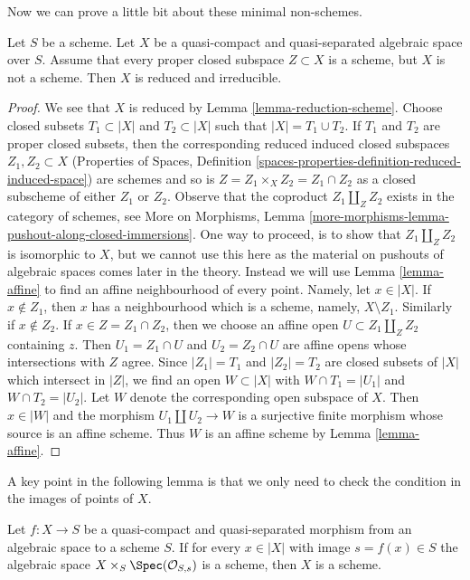 \noindent
Now we can prove a little bit about these minimal non-schemes.

\begin{lemma}
\label{lemma-minimal-nonscheme}
Let $S$ be a scheme. Let $X$ be a quasi-compact and quasi-separated
algebraic space over $S$. Assume that every proper closed subspace
$Z \subset X$ is a scheme, but $X$ is not a scheme. Then $X$ is reduced
and irreducible.
\end{lemma}

\begin{proof}
We see that $X$ is reduced by Lemma \ref{lemma-reduction-scheme}.
Choose closed subsets $T_1 \subset |X|$ and $T_2 \subset |X|$ such that
$|X| = T_1 \cup T_2$. If $T_1$ and $T_2$ are proper closed subsets,
then the corresponding reduced induced closed subspaces $Z_1, Z_2 \subset X$
(Properties of Spaces, Definition
\ref{spaces-properties-definition-reduced-induced-space})
are schemes and so is $Z = Z_1 \times_X Z_2 = Z_1 \cap Z_2$ as a closed
subscheme of either $Z_1$ or $Z_2$. Observe that the coproduct
$Z_1 \amalg_Z Z_2$ exists in the category of schemes, see
More on Morphisms, Lemma
\ref{more-morphisms-lemma-pushout-along-closed-immersions}.
One way to proceed, is to show that $Z_1 \amalg_Z Z_2$ is isomorphic to $X$,
but we cannot use this here as the material on pushouts of algebraic
spaces comes later in the theory. Instead we will use
Lemma \ref{lemma-affine} to find an affine neighbourhood of every point.
Namely, let $x \in |X|$. If $x \not \in Z_1$, then $x$ has a neighbourhood
which is a scheme, namely, $X \setminus Z_1$. Similarly if $x \not \in Z_2$.
If $x \in Z = Z_1 \cap Z_2$, then we choose an affine open
$U \subset Z_1 \amalg_Z Z_2$ containing $z$. Then $U_1 = Z_1 \cap U$
and $U_2 = Z_2 \cap U$ are affine opens whose intersections with
$Z$ agree. Since $|Z_1| = T_1$ and $|Z_2| = T_2$ are closed subsets of
$|X|$ which intersect in $|Z|$, we find an open $W \subset |X|$
with $W \cap T_1 = |U_1|$ and $W \cap T_2 = |U_2|$. Let $W$ denote the
corresponding open subspace of $X$. Then $x \in |W|$ and the morphism
$U_1 \amalg U_2 \to W$ is a surjective finite morphism whose source
is an affine scheme. Thus $W$ is an affine scheme by
Lemma \ref{lemma-affine}.
\end{proof}

\noindent
A key point in the following lemma is that we only need to check
the condition in the images of points of $X$.

\begin{lemma}
\label{lemma-enough-local}
Let $f: X \to S$ be a quasi-compact and quasi-separated morphism from an
algebraic space to a scheme $S$. If for every $x \in |X|$ with image
$s = f(x) \in S$ the algebraic space $X \times_S \Spec(\mathcal{O}_{S,s})$
is a scheme, then $X$ is a scheme.
\end{lemma}

